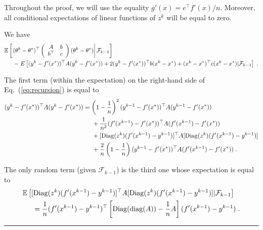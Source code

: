 \documentclass{article}
\newcommand{\diag}{\mathop{\rm diag}}
\newcommand{\Diag}{\mathop{\rm Diag}}
\newcommand{\BlackBox}{\rule{1.5ex}{1.5ex}}  %
\newenvironment{proof}{\par\noindent{\bf Proof\ }}{\hfill\BlackBox\\[2mm]}
\newcommand{\eq}[1]{Eq.~(\ref{eq:#1})}
\def\diag{\operatorname{diag}}
\def\E{_{\scriptscriptstyle E}}
\def \E{{\mathbb E}}
\def \E{{\mathbb E}}
\begin{document}
\begin{proof}
Throughout the proof, we will use the equality $g'(x) = e^\top f'(x) / n$. Moreover, all conditional expectations of linear functions of $z^k$ will be equal to zero.

We have
\begin{align}
&\E\left[\left.(\theta^k - \theta^*)^\top \left(\begin{array}{cc} A & b \\ b^\top & c
\end{array}\right) (\theta^k - \theta^*)\right| \mathcal{F}_{k-1}\right] \nonumber\\
&\hspace*{.5cm}= E\left[ (y^k - f'(x^\ast))^\top A (y^k - f'(x^\ast))+ 2 (y^k - f'(x^\ast))^\top b (x^k - x^\ast) + (x^k - x^\ast)^\top c (x^k - x^\ast)| \mathcal{F}_{k-1}\right] \; .
\label{eq:recursion}
\end{align}

The first term (within the expectation) on the right-hand side of \eq{recursion} is equal to
\begin{align*}
(y^k - f'(x^\ast))^\top A (y^k - f'(x^\ast)) & = \left(1 - \frac{1}{n}\right)^2(y^{k-1} - f'(x^\ast))^\top A (y^{k-1} - f'(x^\ast))\\
& \hspace*{.5cm} + \frac{1}{n^2}(f'(x^{k-1}) - f'(x^\ast))^\top A (f'(x^{k-1}) - f'(x^\ast))\\
& \hspace*{.5cm} + [\Diag(z^k) (f'(x^{k-1}) - y^{k-1})]^\top A [\Diag(z^k) (f'(x^{k-1}) - y^{k-1})]\\
& \hspace*{.5cm} + \frac{2}{n}\left(1 - \frac{1}{n}\right)(y^{k-1} - f'(x^\ast))^\top A (f'(x^{k-1}) - f'(x^\ast)) \; .
\end{align*}

The only random term (given $\mathcal{F}_{k-1}$) is the third one whose expectation is equal to
\begin{align*}
&\E\left[[\Diag(z^k) (f'(x^{k-1}) - y^{k-1})]^\top A [\Diag(z^k) (f'(x^{k-1}) - y^{k-1})]| \mathcal{F}_{k-1}\right]\\
&\hspace*{.5cm} = \frac{1}{n}(f'(x^{k-1}) - y^{k-1})^\top\left[\Diag(\diag(A)) - \frac{1}{n}A\right](f'(x^{k-1}) - y^{k-1}) \; .
\end{align*}


\end{proof}
\end{document}
